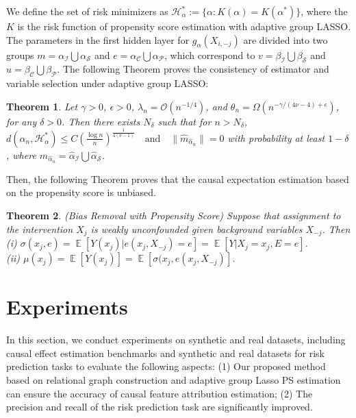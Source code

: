 \documentclass[letterpaper]{article} %
\newcommand{\mc}{\mathcal}
\DeclareMathOperator{\E}{\mathbb{E}}
\newtheorem{theorem}{Theorem}
\theoremstyle{definition}
\theoremstyle{remark}
\begin{document}
We define the set of risk minimizers as
$\mc{H}^*_{\alpha}:= \{\alpha: K(\alpha) = K(\alpha^*)\}$, where the $K$ is the risk function of propensity score estimation with adaptive group LASSO. The parameters in the first hidden layer for $g_\alpha(X_{i,-j})$ are divided into two groups $ m =  \alpha_\mathcal{I} \bigcup  \alpha_\mathcal{S}$ and $ e=  \alpha_\mathcal{C} \bigcup  \alpha_\mathcal{P}$, which correspond to $v = \beta_\mathcal{I} \bigcup \beta_\mathcal{S}$ and $u = \beta_\mathcal{C} \bigcup \beta_\mathcal{P}$. The following Theorem proves the consistency of estimator and variable selection under adaptive group LASSO:
\begin{theorem}
Let $\gamma>0$, $\epsilon>0$, $\lambda_n = \mathcal{O}(n^{-1/4})$, and $\theta_n =\Omega (n^{-\gamma/(4\nu -4)+ \epsilon})$, for any $\delta >0$. Then there exists $N_\delta$ such that for $n > N_\delta$, $d(\hat \alpha_n, \mc{H^*_{\alpha}})  \le C \left( \frac{\log n}{n}\right)^{\frac{1}{4(\nu-1)}} \quad \text{and} \quad 
\|\hat{m}_{\hat \alpha_n}\| = 0$ with probability at least $1 -\delta$, where $\hat{m}_{\hat \alpha_n} = \hat{\alpha}_\mathcal{I} \bigcup \hat{\alpha}_\mathcal{S}$.
\label{thm:main}
\end{theorem}

Then, the following Theorem proves that the causal expectation estimation based on the propensity score is unbiased.

\begin{theorem}
\label{thm:bigtheorem}
(Bias Removal with Propensity Score) Suppose that
assignment to the intervention $X_j$ is weakly unconfounded given background variables $X_{-j}$. Then \\
(i) $\sigma(x_j, e) = \E[Y(x_j)|e(x_j, X_{-j}) = e] = \E[Y|X_j = x_j,E = e]$. \\
(ii) $\mu(x_j) = \E[Y(x_j)] = \E[\sigma(x_j, e(x_j, X_{-j})]$.
\end{theorem}


\section{Experiments}

In this section, we conduct experiments on synthetic and real datasets, including causal effect estimation benchmarks and synthetic and real datasets for risk prediction tasks to evaluate the following aspects: (1) Our proposed method based on relational graph construction and adaptive group Lasso PS estimation can ensure the accuracy of causal feature attribution estimation; (2) The precision and recall of the risk prediction task are significantly improved. 
\end{document}
